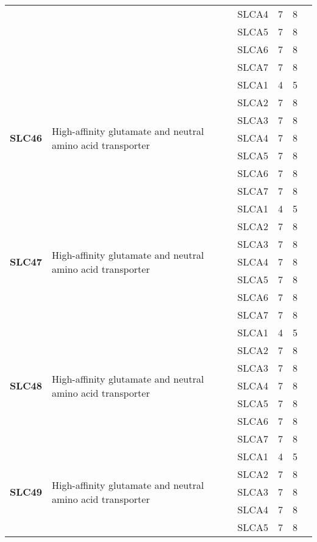 \documentclass[12pt]{report}
\begin{document}
\begin{center}
\begin{longtable}{|p{1.5cm}|p{3.2cm}|p{1.9cm}|p{1.65cm}|p{3cm}|p{3cm}|}
\cline{3-6}
&&SLCA4&7 & 8&\\ 
\cline{3-6}
&&SLCA5&7 & 8&\\ 
\cline{3-6}
&&SLCA6&7 & 8&\\ 
\cline{3-6}
&&SLCA7&7 & 8&\\ 
\hline
\multirow{7}{1.5cm}{\textbf{SLC46}} & \multirow{7}{4cm}{High-affinity glutamate and neutral amino acid transporter} & SLCA1 & 4 & 5\\ 
\cline{3-6}
&&SLCA2&7 & 8&\\ 
\cline{3-6}
&&SLCA3&7 & 8&\\ 
\cline{3-6}
&&SLCA4&7 & 8&\\ 
\cline{3-6}
&&SLCA5&7 & 8&\\ 
\cline{3-6}
&&SLCA6&7 & 8&\\ 
\cline{3-6}
&&SLCA7&7 & 8&\\ 
\hline
\multirow{7}{1.5cm}{\textbf{SLC47}} & \multirow{7}{4cm}{High-affinity glutamate and neutral amino acid transporter} & SLCA1 & 4 & 5\\ 
\cline{3-6}
&&SLCA2&7 & 8&\\ 
\cline{3-6}
&&SLCA3&7 & 8&\\ 
\cline{3-6}
&&SLCA4&7 & 8&\\ 
\cline{3-6}
&&SLCA5&7 & 8&\\ 
\cline{3-6}
&&SLCA6&7 & 8&\\ 
\cline{3-6}
&&SLCA7&7 & 8&\\ 
\hline
\multirow{7}{1.5cm}{\textbf{SLC48}} & \multirow{7}{4cm}{High-affinity glutamate and neutral amino acid transporter} & SLCA1 & 4 & 5\\ 
\cline{3-6}
&&SLCA2&7 & 8&\\ 
\cline{3-6}
&&SLCA3&7 & 8&\\ 
\cline{3-6}
&&SLCA4&7 & 8&\\ 
\cline{3-6}
&&SLCA5&7 & 8&\\ 
\cline{3-6}
&&SLCA6&7 & 8&\\ 
\cline{3-6}
&&SLCA7&7 & 8&\\ 
\hline
\multirow{7}{1.5cm}{\textbf{SLC49}} & \multirow{7}{4cm}{High-affinity glutamate and neutral amino acid transporter} & SLCA1 & 4 & 5\\ 
\cline{3-6}
&&SLCA2&7 & 8&\\ 
\cline{3-6}
&&SLCA3&7 & 8&\\ 
\cline{3-6}
&&SLCA4&7 & 8&\\ 
\cline{3-6}
&&SLCA5&7 & 8&\\ 

\end{longtable}
\end{center}
\end{document}
